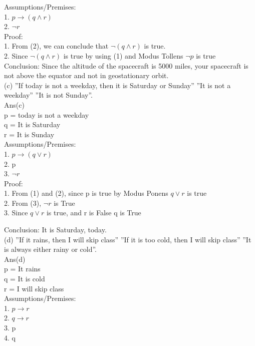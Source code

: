 \documentclass{article}
\begin{document}
 Assumptions/Premises:\\
 1. $p \rightarrow (q \land r)$\\
 2. $\neg r$\\

 Proof:\\
 1. From (2), we can conclude that $\neg (q \land r) $ is true.\\
 2. Since $\neg (q \land r) $ is true by using (1) and Modus Tollens $\neg p$ is true\\

 Conclusion: Since the altitude of the spacecraft is 5000 miles, your spacecraft is not above the equator and not in geostationary orbit.\\

 \Large (c) ”If today is not a weekday, then it is Saturday or Sunday” ”It is not a weekday” ”It is not Sunday”.\\
 
Ans(c)\\
p = today is not a weekday\\
q = It is Saturday\\
r = It is Sunday\\

 Assumptions/Premises:\\
 1. $p \rightarrow (q \lor r)$\\
 2. p\\
 3. $\neg r$\\

 Proof:\\
 1. From (1) and (2), since p is true by Modus Ponens $q \lor r$ is true\\
 2. From (3), $\neg r$ is True \\
 3. Since $q \lor r$ is true, and r is False q is True

 Conclusion: It is Saturday, today.\\

\Large (d) ”If it rains, then I will skip class” ”If it is too cold, then I will skip class” ”It is always either rainy or cold”.\\
 
Ans(d)\\
p = It rains\\
q = It is cold\\
r = I will skip class\\

 Assumptions/Premises:\\
 1. $p \rightarrow r$\\
 2. $q \rightarrow r$\\
 3. p\\
 4. q\\
\end{document}
